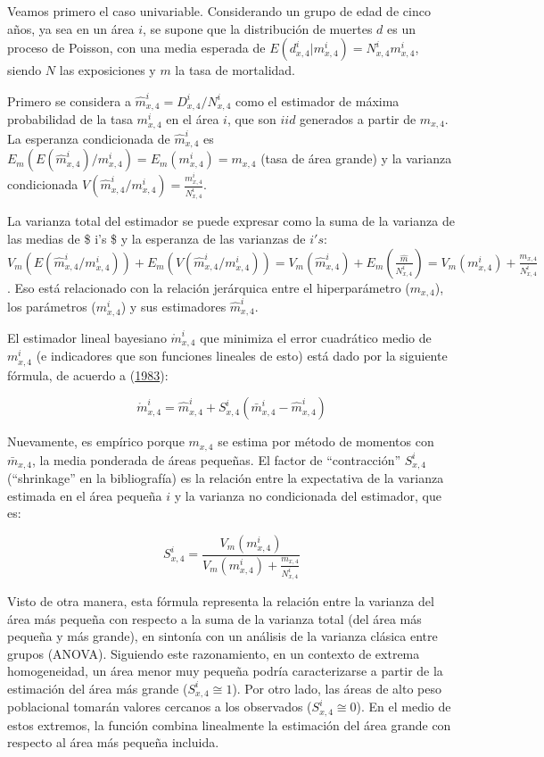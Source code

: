 \documentclass[12pt,spanish,]{article}
\begin{document}
Veamos primero el caso univariable. Considerando un grupo de edad de
cinco años, ya sea en un área \(i\), se supone que la distribución de
muertes \(d\) es un proceso de Poisson, con una media esperada de
\(E(d_ {x,4}^{i}|{m_{x,4}^{i}})=N_{x,4}^{i}m_{x,4}^{i}\), siendo \(N\)
las exposiciones y \(m\) la tasa de mortalidad.

Primero se considera a \(\hat{m}_{x,4}^{i}=D_{x,4}^{i}/N_{x,4}^{i}\)
como el estimador de máxima probabilidad de la tasa \(m_{x,4}^{i}\) en
el área \(i\), que son \(iid\) generados a partir de \(m_{x,4}\). La
esperanza condicionada de \(\hat{m}_{x,4}^{i}\) es
\(E_{m}(E({\hat{m}}_{x,4}^{i})/m_{x,4}^{i})=E_{m}({m_{x, 4}^{i}}) = m_{x,4}\)
(tasa de área grande) y la varianza condicionada
\(V({\hat{m}}_{x,4}^{i}/m_{x,4}^{i})=\frac{m_{x,4}^{i}}{N_{x,4}^{i}}\).

La varianza total del estimador se puede expresar como la suma de la
varianza de las medias de \$ i's \$ y la esperanza de las varianzas de
\(i's\):
\(V_{m}(E(\hat{m}_{x,4}^{i}/m_{x,4}^{i}))+E_{m}(V({\hat{m}}_{x,4}^ {i}/m_{x,4}^{i}))=V_{m}(\hat{m}_{x,4}^{i})+E_{m}(\frac{{\hat{m}}}{N_{x,4}^{i}})=V_{m}(m_{x,4}^{i})+\frac{m_{x, 4}}{N_{x,4}^{i}}\).
Eso está relacionado con la relación jerárquica entre el hiperparámetro
(\(m_{x, 4}\)), los parámetros (\(m_{x,4}^{i}\)) y sus estimadores
\(\hat{m}_{x,4}^{i}\).

El estimador lineal bayesiano \(\mathring{m}_{x, 4}^{i}\) que minimiza
el error cuadrático medio de \({m}_{x,4}^{i}\) (e indicadores que son
funciones lineales de esto) está dado por la siguiente fórmula, de
acuerdo a (\protect\hyperlink{ref-Robbins1983}{1983}):

\[\mathring{m}_{x,4}^{i}=\hat{m}_{x, 4}^{i}+S_{x,4}^{i}(\bar{m}_{x,4}^{i}-\hat{m}_{x,4}^{i})\]

Nuevamente, es empírico porque \(m_{x,4}\) se estima por método de
momentos con \(\bar{m}_{x,4}\), la media ponderada de áreas pequeñas. El
factor de ``contracción'' \(S_{x, 4}^{i}\) (``shrinkage'' en la
bibliografía) es la relación entre la expectativa de la varianza
estimada en el área pequeña \(i\) y la varianza no condicionada del
estimador, que es:

\[S_{x,4}^{i}=\frac{V_{m}(m_{x,4}^{i})}{V_{m}(m_{x,4}^{i})+\frac{m_{x,4}}{N_{x,4}^{i}}}\]

Visto de otra manera, esta fórmula representa la relación entre la
varianza del área más pequeña con respecto a la suma de la varianza
total (del área más pequeña y más grande), en sintonía con un análisis
de la varianza clásica entre grupos (ANOVA). Siguiendo este
razonamiento, en un contexto de extrema homogeneidad, un área menor muy
pequeña podría caracterizarse a partir de la estimación del área más
grande (\(S_{x, 4} ^ {i} \cong 1\)). Por otro lado, las áreas de alto
peso poblacional tomarán valores cercanos a los observados
(\(S_{x,4}^{i}\cong 0\)). En el medio de estos extremos, la función
combina linealmente la estimación del área grande con respecto al área
más pequeña incluida.
\end{document}

